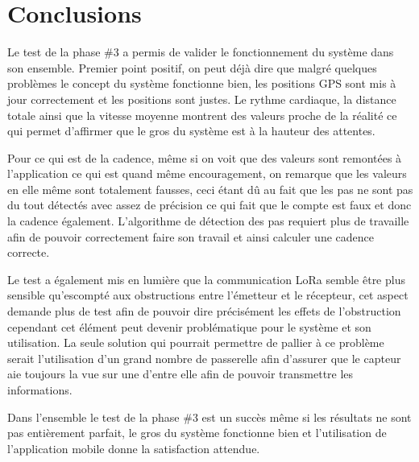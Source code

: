 \section{Conclusions}

Le test de la phase \#3 a permis de valider le fonctionnement du système dans son ensemble. Premier point positif, on peut déjà dire que malgré quelques problèmes le concept du système fonctionne bien, les positions GPS sont mis à jour correctement et les positions sont justes. Le rythme cardiaque, la distance totale ainsi que la vitesse moyenne montrent des valeurs proche de la réalité ce qui permet d'affirmer que le gros du système est à la hauteur des attentes.

Pour ce qui est de la cadence, même si on voit que des valeurs sont remontées à l'application ce qui est quand même encouragement, on remarque que les valeurs en elle même sont totalement fausses, ceci étant dû au fait que les pas ne sont pas du tout détectés avec assez de précision ce qui fait que le compte est faux et donc la cadence également. L'algorithme de détection des pas requiert plus de travaille afin de pouvoir correctement faire son travail et ainsi calculer une cadence correcte.

Le test a également mis en lumière que la communication LoRa semble être plus sensible qu'escompté aux obstructions entre l'émetteur et le récepteur, cet aspect demande plus de test afin de pouvoir dire précisément les effets de l'obstruction cependant cet élément peut devenir problématique pour le système et son utilisation. La seule solution qui pourrait permettre de pallier à ce problème serait l'utilisation d'un grand nombre de passerelle afin d'assurer que le capteur aie toujours la vue sur une d'entre elle afin de pouvoir transmettre les informations.

Dans l'ensemble le test de la phase \#3 est un succès même si les résultats ne sont pas entièrement parfait, le gros du système fonctionne bien et l'utilisation de l'application mobile donne la satisfaction attendue.